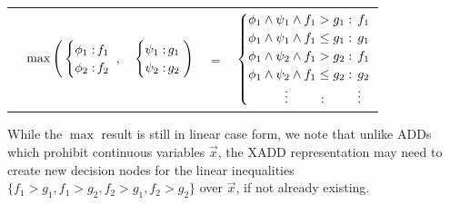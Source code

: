 \vspace{-5mm}
{\footnotesize
\begin{center}
\begin{tabular}{r c c c l}
&
\hspace{-7mm} $\max \Bigg(
  \begin{cases}
    \phi_1: \hspace{-2mm} & \hspace{-1mm} f_1 \\ 
    \phi_2: \hspace{-2mm} & \hspace{-1mm} f_2 \\ 
  \end{cases}$
$,$
&
\hspace{-4mm}
  $\begin{cases}
    \psi_1: \hspace{-2mm} & \hspace{-1mm} g_1 \\ 
    \psi_2: \hspace{-2mm} & \hspace{-1mm} g_2 \\ 
  \end{cases} \Bigg)$
&
\hspace{-4mm} 
$ = $
&
\hspace{-4mm}
  $\begin{cases}
  \phi_1 \wedge \psi_1 \wedge f_1 > g_1    : & \hspace{-2mm} f_1 \\ 
  \phi_1 \wedge \psi_1 \wedge f_1 \leq g_1 : & \hspace{-2mm} g_1 \\ 
  \phi_1 \wedge \psi_2 \wedge f_1 > g_2    : & \hspace{-2mm}f_1 \\ 
  \phi_1 \wedge \psi_2 \wedge f_1 \leq g_2 : & \hspace{-2mm} g_2 \\ 
  \hspace{1cm}\vdots \hspace{8mm}: & \hspace{-2mm} \vdots
  \end{cases}$
\end{tabular}
\end{center}
\vspace{-3mm}
} While the $\max$ result is still in linear case form, we note that
unlike ADDs which prohibit continuous variables $\vec{x}$, the XADD
representation may need to create new decision nodes for the linear
inequalities $\{ f_1 > g_1, f_1 > g_2, f_2 > g_1, f_2 > g_2 \}$ over
$\vec{x}$, if not already existing.

